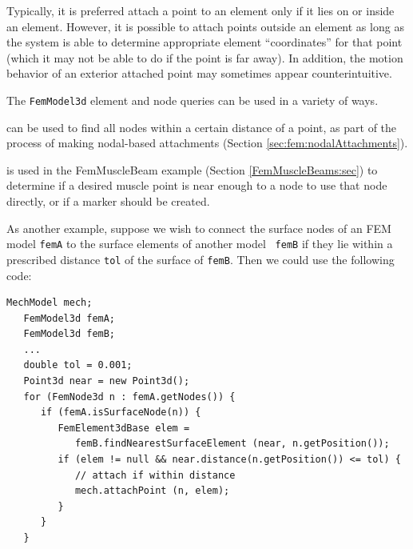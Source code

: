 \begin{sideblock}
Typically, it is preferred attach a point to an element only if it
lies on or inside an element. However, it is possible to attach points
outside an element as long as the system is able to determine
appropriate element ``coordinates'' for that point (which it may not
be able to do if the point is far away). In addition, the motion
behavior of an exterior attached point may sometimes appear
counterintuitive.
\end{sideblock}

The {\tt FemModel3d} element and node queries can be used in a variety
of ways.

can be used to find all nodes within a certain distance of a point, as
part of the process of making nodal-based attachments
(Section \ref{sec:fem:nodalAttachments}).

is used in the FemMuscleBeam example
(Section \ref{FemMuscleBeams:sec}) to determine if a desired muscle
point is near enough to a node to use that node directly, or if a
marker should be created.

As another example, suppose we wish to connect the surface nodes of an
FEM model {\tt femA} to the surface elements of another model {\tt
femB} if they lie within a prescribed distance {\tt tol} of the
surface of {\tt femB}. Then we could use the following code:
%
\begin{lstlisting}[]
   MechModel mech;
   FemModel3d femA;
   FemModel3d femB;
   ...
   double tol = 0.001;
   Point3d near = new Point3d();
   for (FemNode3d n : femA.getNodes()) {
      if (femA.isSurfaceNode(n)) {
         FemElement3dBase elem = 
            femB.findNearestSurfaceElement (near, n.getPosition());
         if (elem != null && near.distance(n.getPosition()) <= tol) {
            // attach if within distance
            mech.attachPoint (n, elem);
         }
      }
   }
\end{lstlisting}
%

